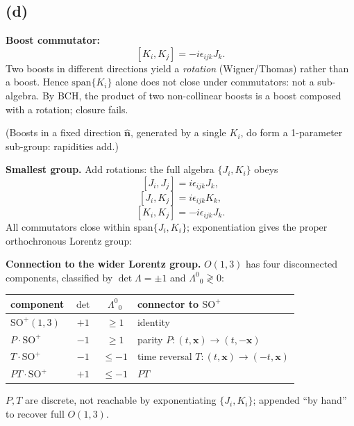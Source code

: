 \documentclass[11pt]{article}
\begin{document}

\subsection*{(d)}

\textbf{Boost commutator:}
\[ [K_i,K_j] = -i\epsilon_{ijk}J_k. \]
Two boosts in different directions yield a \emph{rotation} (Wigner/Thomas) rather than a boost. Hence $\mathrm{span}\{K_i\}$ alone does not close under commutators: not a sub-algebra. By BCH, the product of two non-collinear boosts is a boost composed with a rotation; closure fails.

(Boosts in a fixed direction $\hat{\bm n}$, generated by a single $K_i$, do form a 1-parameter sub-group: rapidities add.)

\textbf{Smallest group.} Add rotations: the full algebra $\{J_i,K_i\}$ obeys
\[ [J_i,J_j]=i\epsilon_{ijk}J_k, \]
\[ [J_i,K_j]=i\epsilon_{ijk}K_k, \]
\[ [K_i,K_j]=-i\epsilon_{ijk}J_k. \]
All commutators close within $\mathrm{span}\{J_i,K_i\}$; exponentiation gives the proper orthochronous Lorentz group:

\textbf{Connection to the wider Lorentz group.} $O(1,3)$ has four disconnected components, classified by $\det\Lambda=\pm 1$ and $\Lambda^0{}_0\gtrless 0$:
\begin{center}
\begin{tabular}{l c c l}
\toprule
component & $\det$ & $\Lambda^0{}_0$ & connector to $\mathrm{SO}^+$\\
\midrule
$\mathrm{SO}^+(1,3)$ & $+1$ & $\ge 1$ & identity\\
$P\cdot\mathrm{SO}^+$ & $-1$ & $\ge 1$ & parity $P:(t,\bm x)\to(t,-\bm x)$\\
$T\cdot\mathrm{SO}^+$ & $-1$ & $\le -1$ & time reversal $T:(t,\bm x)\to(-t,\bm x)$\\
$PT\cdot\mathrm{SO}^+$ & $+1$ & $\le -1$ & $PT$\\
\bottomrule
\end{tabular}
\end{center}
$P,T$ are discrete, not reachable by exponentiating $\{J_i,K_i\}$; appended ``by hand'' to recover full $O(1,3)$.
\end{document}
